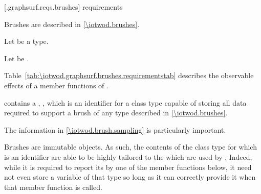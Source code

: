 
 [\iotwod.graphsurf.reqs.brushes]{ requirements}

\pnum
Brushes are described in \ref{\iotwod.brushes}.

\pnum
Let  be a \graphicssurfacestemplparam type.

\pnum
Let  be .

\pnum
Table~\ref{tab:\iotwod.graphsurf.brushes.requirementstab} describes the observable effects of a member functions of .

\pnum
{} contains a , 
, which is an identifier for a class type capable of
storing all data required to support a brush of any type described in
\ref{\iotwod.brushes}. \begin{note}
The information in \ref{\iotwod.brush.sampling} is particularly important.
\end{note}

\pnum
\begin{note}
Brushes are immutable objects. As such, the contents of the class type for which  is an identifier are able to be highly tailored to the \underlyingrendandpresenttechs which are used by . Indeed, while it is required to report its  by one of the member functions below, it need not even store a variable of that type so long as it can correctly provide it when that member function is called.
\end{note}

